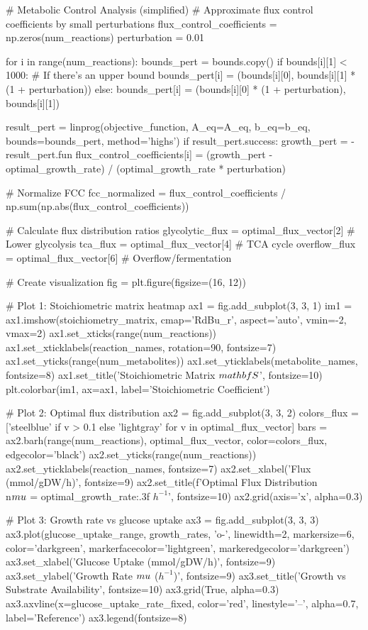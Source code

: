 \documentclass[a4paper, 11pt]{article}
\begin{document}
\begin{pycode}
# Metabolic Control Analysis (simplified)
# Approximate flux control coefficients by small perturbations
flux_control_coefficients = np.zeros(num_reactions)
perturbation = 0.01

for i in range(num_reactions):
    bounds_pert = bounds.copy()
    if bounds[i][1] < 1000:  # If there's an upper bound
        bounds_pert[i] = (bounds[i][0], bounds[i][1] * (1 + perturbation))
    else:
        bounds_pert[i] = (bounds[i][0] * (1 + perturbation), bounds[i][1])

    result_pert = linprog(objective_function, A_eq=A_eq, b_eq=b_eq, bounds=bounds_pert, method='highs')
    if result_pert.success:
        growth_pert = -result_pert.fun
        flux_control_coefficients[i] = (growth_pert - optimal_growth_rate) / (optimal_growth_rate * perturbation)

# Normalize FCC
fcc_normalized = flux_control_coefficients / np.sum(np.abs(flux_control_coefficients))

# Calculate flux distribution ratios
glycolytic_flux = optimal_flux_vector[2]  # Lower glycolysis
tca_flux = optimal_flux_vector[4]  # TCA cycle
overflow_flux = optimal_flux_vector[6]  # Overflow/fermentation

# Create visualization
fig = plt.figure(figsize=(16, 12))

# Plot 1: Stoichiometric matrix heatmap
ax1 = fig.add_subplot(3, 3, 1)
im1 = ax1.imshow(stoichiometry_matrix, cmap='RdBu_r', aspect='auto', vmin=-2, vmax=2)
ax1.set_xticks(range(num_reactions))
ax1.set_xticklabels(reaction_names, rotation=90, fontsize=7)
ax1.set_yticks(range(num_metabolites))
ax1.set_yticklabels(metabolite_names, fontsize=8)
ax1.set_title('Stoichiometric Matrix $\\mathbf{S}$', fontsize=10)
plt.colorbar(im1, ax=ax1, label='Stoichiometric Coefficient')

# Plot 2: Optimal flux distribution
ax2 = fig.add_subplot(3, 3, 2)
colors_flux = ['steelblue' if v > 0.1 else 'lightgray' for v in optimal_flux_vector]
bars = ax2.barh(range(num_reactions), optimal_flux_vector, color=colors_flux, edgecolor='black')
ax2.set_yticks(range(num_reactions))
ax2.set_yticklabels(reaction_names, fontsize=7)
ax2.set_xlabel('Flux (mmol/gDW/h)', fontsize=9)
ax2.set_title(f'Optimal Flux Distribution\\n$\\mu$ = {optimal_growth_rate:.3f} $h^{{-1}}$', fontsize=10)
ax2.grid(axis='x', alpha=0.3)

# Plot 3: Growth rate vs glucose uptake
ax3 = fig.add_subplot(3, 3, 3)
ax3.plot(glucose_uptake_range, growth_rates, 'o-', linewidth=2, markersize=6,
         color='darkgreen', markerfacecolor='lightgreen', markeredgecolor='darkgreen')
ax3.set_xlabel('Glucose Uptake (mmol/gDW/h)', fontsize=9)
ax3.set_ylabel('Growth Rate $\\mu$ ($h^{-1}$)', fontsize=9)
ax3.set_title('Growth vs Substrate Availability', fontsize=10)
ax3.grid(True, alpha=0.3)
ax3.axvline(x=glucose_uptake_rate_fixed, color='red', linestyle='--', alpha=0.7, label='Reference')
ax3.legend(fontsize=8)


\end{pycode}
\end{document}
